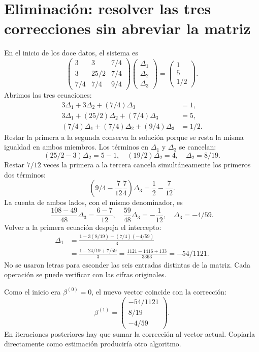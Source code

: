 \documentclass[11pt,a4paper]{article}
\begin{document}
\clearpage
\section{Eliminación: resolver las tres correcciones sin abreviar la matriz}\label{logit43}
En el inicio de los doce datos, el sistema es
\[
\begin{pmatrix}3&3&7/4\\3&25/2&7/4\\7/4&7/4&9/4\end{pmatrix}
\begin{pmatrix}\Delta_1\\\Delta_2\\\Delta_3\end{pmatrix}
=\begin{pmatrix}1\\5\\1/2\end{pmatrix}.
\]
Abrimos las tres ecuaciones:
\[
\begin{aligned}
3\Delta_1+3\Delta_2+(7/4)\Delta_3&=1,\\
3\Delta_1+(25/2)\Delta_2+(7/4)\Delta_3&=5,\\
(7/4)\Delta_1+(7/4)\Delta_2+(9/4)\Delta_3&=1/2.
\end{aligned}
\]
Restar la primera a la segunda conserva la solución
porque se resta la misma igualdad en ambos miembros.
Los términos en $\Delta_1$ y $\Delta_3$ se cancelan:
\[
(25/2-3)\Delta_2=5-1,\quad
(19/2)\Delta_2=4,\quad \boxed{\Delta_2=8/19}.
\]
Restar $7/12$ veces la primera a la tercera cancela simultáneamente
los primeros dos términos:
\[
\left(9/4-\frac7{12}\frac74\right)\Delta_3
=\frac12-\frac7{12}.
\]
La cuenta de ambos lados, con el mismo denominador, es
\[
\frac{108-49}{48}\Delta_3=\frac{6-7}{12},
\quad \frac{59}{48}\Delta_3=-\frac1{12},
\quad \boxed{\Delta_3=-4/59}.
\]
Volver a la primera ecuación despeja el intercepto:
\[
\begin{aligned}
\Delta_1
&=\frac{1-3(8/19)-(7/4)(-4/59)}3\\
&=\frac{1-24/19+7/59}3
=\frac{1121-1416+133}{3363}
=\boxed{-54/1121}.
\end{aligned}
\]
No se usaron letras para esconder las seis entradas distintas
de la matriz. Cada operación se puede verificar con las cifras originales.

Como el inicio era $\beta^{(0)}=0$, el nuevo vector coincide con
la corrección:
\[
\beta^{(1)}=
\begin{pmatrix}-54/1121\\8/19\\-4/59\end{pmatrix}.
\]
En iteraciones posteriores hay que sumar la corrección al vector actual.
Copiarla directamente como estimación produciría otro algoritmo.
\end{document}
